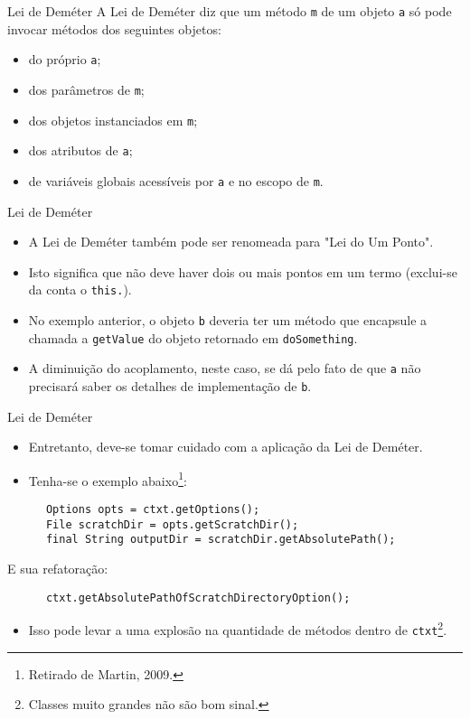 \documentclass[11pt]{beamer}
\begin{document}
  \begin{frame}[fragile]{Lei de Deméter}
    A Lei de Deméter diz que um método \verb|m| de um objeto \verb|a| só pode invocar métodos dos seguintes objetos:
    \begin{itemize}
      \item do próprio \verb|a|;
      \item dos parâmetros de \verb|m|;
      \item dos objetos instanciados em \verb|m|;
      \item dos atributos de \verb|a|;
      \item de variáveis globais acessíveis por \verb|a| e no escopo de \verb|m|.
    \end{itemize}
  \end{frame}

  \begin{frame}[fragile]{Lei de Deméter}
    \begin{itemize}
      \item A Lei de Deméter também pode ser renomeada para "Lei do Um Ponto".
      \item Isto significa que não deve haver dois ou mais pontos em um termo (exclui-se da conta o \verb|this.|).
      \item No exemplo anterior, o objeto \verb|b| deveria ter um método que encapsule a chamada a \verb|getValue| do objeto retornado em \verb|doSomething|.
      \item A diminuição do acoplamento, neste caso, se dá pelo fato de que \verb|a| não precisará saber os detalhes de implementação de \verb|b|. 
    \end{itemize}
  \end{frame}

  \begin{frame}[fragile]{Lei de Deméter}
    \begin{itemize}
      \item Entretanto, deve-se tomar cuidado com a aplicação da Lei de Deméter.
      \item Tenha-se o exemplo abaixo\footnote{Retirado de Martin, 2009.}:
    \end{itemize}
    \begin{lstlisting}
      Options opts = ctxt.getOptions();
      File scratchDir = opts.getScratchDir();
      final String outputDir = scratchDir.getAbsolutePath();
    \end{lstlisting}
    E sua refatoração:
    \begin{lstlisting}
      ctxt.getAbsolutePathOfScratchDirectoryOption();
    \end{lstlisting}
    \begin{itemize}
      \item Isso pode levar a uma explosão na quantidade de métodos dentro de \verb|ctxt|\footnote{Classes muito grandes não são bom sinal.}.
    \end{itemize}
  \end{frame}
\end{document}
